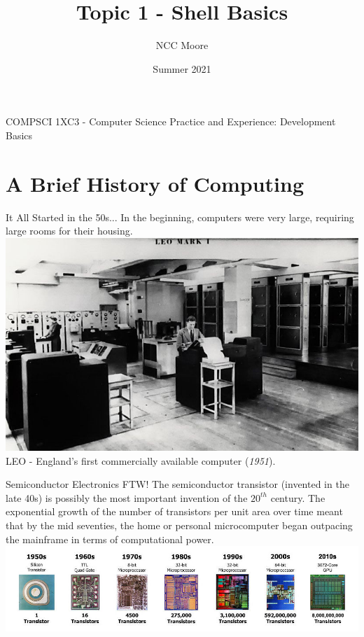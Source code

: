 \documentclass[11pt]{beamer}
\author{NCC Moore}
\title{Topic 1 - Shell Basics}
\institute{McMaster University}
\date{Summer 2021}
\begin{document}
\begin{frame}
\center
COMPSCI 1XC3 - Computer Science Practice and Experience:
Development Basics
\titlepage
\end{frame}

\begin{frame}
\tableofcontents
\end{frame}

\section[History]{A Brief History of Computing}
\begin{frame}{It All Started in the 50s...}
In the beginning, computers were very large, requiring large rooms for their housing.
\center
\includegraphics[scale=0.3]{Leo.jpg} \\
LEO - England's first commercially available computer (\emph{1951}).
\end{frame}

\begin{frame}{Semiconductor Electronics FTW!}
The semiconductor transistor (invented in the late 40s) is possibly the most important invention of the $20^{th}$ century. The exponential growth of the number of transistors per unit area over time meant that by the mid seventies, the home or personal microcomputer began outpacing the mainframe in terms of computational power.  
\center
\includegraphics[scale=0.3]{microchip.jpg}
\end{frame}
\end{document}
